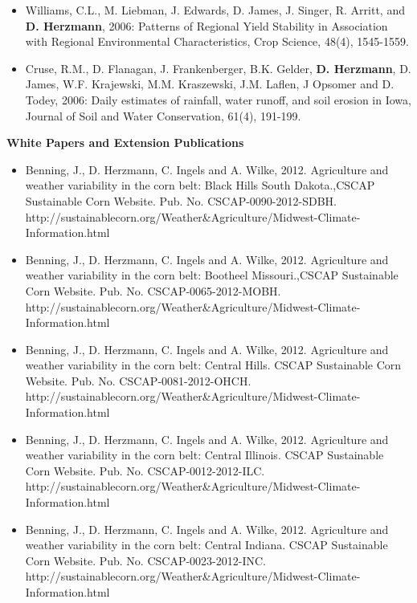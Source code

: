 \begin{itemize}
\item Williams, C.L., M. Liebman, J. Edwards, D. James, J. Singer, R. Arritt, and \textbf{D. Herzmann}, 2006: Patterns of Regional Yield Stability in Association with Regional Environmental Characteristics, Crop Science, 48(4), 1545-1559.
\item Cruse, R.M., D. Flanagan, J. Frankenberger, B.K. Gelder, \textbf{D. Herzmann}, D. James, W.F. Krajewski, M.M. Kraszewski, J.M. Laflen, J Opsomer and D. Todey, 2006: Daily estimates of rainfall, water runoff, and soil erosion in Iowa, Journal of Soil and Water Conservation, 61(4), 191-199.
\end{itemize}

\normalsize \sf
\normalsize \bf White Papers and Extension Publications
\normalsize \sf
\begin{itemize}
\item Benning, J., D. Herzmann, C. Ingels and A. Wilke, 2012. Agriculture and weather variability in the corn belt: Black Hills South Dakota.,CSCAP Sustainable Corn Website. Pub. No. CSCAP-0090-2012-SDBH. http://sustainablecorn.org/Weather\&Agriculture/Midwest-Climate-Information.html

\item Benning, J., D. Herzmann, C. Ingels and A. Wilke, 2012. Agriculture and weather variability in the corn belt: Bootheel Missouri.,CSCAP Sustainable Corn Website. Pub. No. CSCAP-0065-2012-MOBH. http://sustainablecorn.org/Weather\&Agriculture/Midwest-Climate-Information.html

\item Benning, J., D. Herzmann, C. Ingels and A. Wilke, 2012. Agriculture and weather variability in the corn belt: Central Hills. CSCAP Sustainable Corn Website. Pub. No. CSCAP-0081-2012-OHCH. http://sustainablecorn.org/Weather\&Agriculture/Midwest-Climate-Information.html

\item Benning, J., D. Herzmann, C. Ingels and A. Wilke, 2012. Agriculture and weather variability in the corn belt: Central Illinois. CSCAP Sustainable Corn Website. Pub. No. CSCAP-0012-2012-ILC. http://sustainablecorn.org/Weather\&Agriculture/Midwest-Climate-Information.html

\item Benning, J., D. Herzmann, C. Ingels and A. Wilke, 2012. Agriculture and weather variability in the corn belt: Central Indiana. CSCAP Sustainable Corn Website. Pub. No. CSCAP-0023-2012-INC. http://sustainablecorn.org/Weather\&Agriculture/Midwest-Climate-Information.html


\end{itemize}
